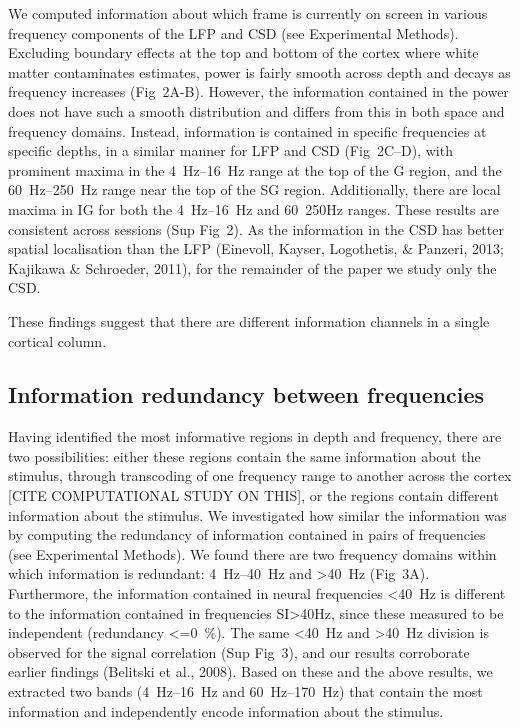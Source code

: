 We computed information about which frame is currently on screen in various frequency components of the \ac{LFP} and \ac{CSD} (see Experimental Methods).
Excluding boundary effects at the top and bottom of the cortex where white matter contaminates estimates, power is fairly smooth across depth and decays as frequency increases (Fig~2A-B).
However, the information contained in the power does not have such a smooth distribution and differs from this in both space and frequency domains.
Instead, information is contained in specific frequencies at specific depths, in a similar manner for \ac{LFP} and \ac{CSD} (Fig~2C--D), with prominent maxima in the \SIrange{4}{16}{Hz} range at the top of the \ac{G} region, and the \SIrange{60}{250}{Hz} range near the top of the \ac{SG} region.
Additionally, there are local maxima in \ac{IG} for both the \SIrange{4}{16}{Hz} and \SI{60}{250}{Hz} ranges.
These results are consistent across sessions (Sup Fig~2).
As the information in the \ac{CSD} has better spatial localisation than the \ac{LFP} (Einevoll, Kayser, Logothetis, \& Panzeri, 2013; Kajikawa \& Schroeder, 2011), for the remainder of the paper we study only the \ac{CSD}.

These findings suggest that there are different information channels in a single cortical column.

\subsection{Information redundancy between frequencies}
Having identified the most informative regions in depth and frequency, there are two possibilities: either these regions contain the same information about the stimulus, through transcoding of one frequency range to another across the cortex [CITE COMPUTATIONAL STUDY ON THIS], or the regions contain different information about the stimulus.
We investigated how similar the information was by computing the redundancy of information contained in pairs of frequencies (see Experimental Methods).
We found there are two frequency domains within which information is redundant: \SIrange{4}{40}{Hz} and \SI{>40}{Hz} (Fig~3A).
Furthermore, the information contained in neural frequencies \SI{<40}{Hz} is different to the information contained in frequencies SI{>40}{Hz}, since these measured to be independent (redundancy \SI{<=0}{\percent}).
The same \SI{<40}{Hz} and \SI{>40}{Hz} division is observed for the signal correlation (Sup Fig~3), and our results corroborate earlier findings (Belitski et al., 2008).
Based on these and the above results, we extracted two bands (\SIrange{4}{16}{Hz} and \SIrange{60}{170}{Hz}) that contain the most information and independently encode information about the stimulus.

